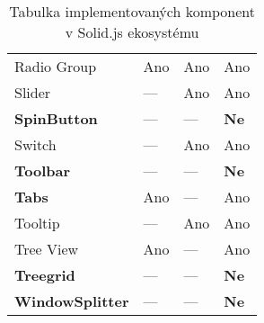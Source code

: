 \begin{table}[ht]
\begin{tabularx}{\textwidth}{Y Y Y Y}
        Radio Group             & Ano                   & Ano                & Ano                               \\
        Slider                  & ---                   & Ano                & Ano                               \\
        \textbf{SpinButton}     & ---                   & ---                & \textbf{Ne}                       \\
        Switch                  & ---                   & Ano                & Ano                               \\
        \textbf{Toolbar}        & ---                   & ---                & \textbf{Ne}                       \\
        \textbf{Tabs}           & Ano                   & ---                & Ano                               \\
        Tooltip                 & ---                   & Ano                & Ano                               \\
        Tree View               & Ano                   & ---                & Ano                               \\
        \textbf{Treegrid}       & ---                   & ---                & \textbf{Ne}                       \\
        \textbf{WindowSplitter} & ---                   & ---                & \textbf{Ne}                       \\
    \end{tabularx}
    \caption{Tabulka implementovaných komponent v Solid.js ekosystému}
    \label{tab:implemented-components}
\end{table}
